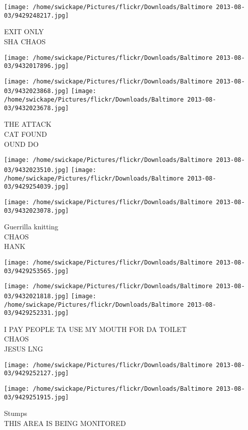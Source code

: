 \documentclass[10pt,letterpaper]{article}
\begin{document}
\vspace{0.25in}
\texttt{[image: /home/swickape/Pictures/flickr/Downloads/Baltimore 2013-08-03/9429248217.jpg]}

EXIT ONLY\\
SHA CHAOS
\pagebreak

\texttt{[image: /home/swickape/Pictures/flickr/Downloads/Baltimore 2013-08-03/9432017896.jpg]}

\vspace{0.25in}
\texttt{[image: /home/swickape/Pictures/flickr/Downloads/Baltimore 2013-08-03/9432023868.jpg]}
\texttt{[image: /home/swickape/Pictures/flickr/Downloads/Baltimore 2013-08-03/9432023678.jpg]}

THE ATTACK\\
CAT FOUND\\
OUND DO
\pagebreak

\texttt{[image: /home/swickape/Pictures/flickr/Downloads/Baltimore 2013-08-03/9432023510.jpg]}
\texttt{[image: /home/swickape/Pictures/flickr/Downloads/Baltimore 2013-08-03/9429254039.jpg]}

\texttt{[image: /home/swickape/Pictures/flickr/Downloads/Baltimore 2013-08-03/9432023078.jpg]}

Guerrilla knitting\\
CHAOS\\
HANK
\pagebreak

\texttt{[image: /home/swickape/Pictures/flickr/Downloads/Baltimore 2013-08-03/9429253565.jpg]}

\vspace{0.25in}
\texttt{[image: /home/swickape/Pictures/flickr/Downloads/Baltimore 2013-08-03/9432021818.jpg]}
\texttt{[image: /home/swickape/Pictures/flickr/Downloads/Baltimore 2013-08-03/9429252331.jpg]}

I PAY PEOPLE TA USE MY MOUTH FOR DA TOILET\\
CHAOS\\
JESUS LNG
\pagebreak

\texttt{[image: /home/swickape/Pictures/flickr/Downloads/Baltimore 2013-08-03/9429252127.jpg]}

\vspace{0.25in}
\texttt{[image: /home/swickape/Pictures/flickr/Downloads/Baltimore 2013-08-03/9429251915.jpg]}

Stumps\\
THIS AREA IS BEING MONITORED
\pagebreak
\end{document}
